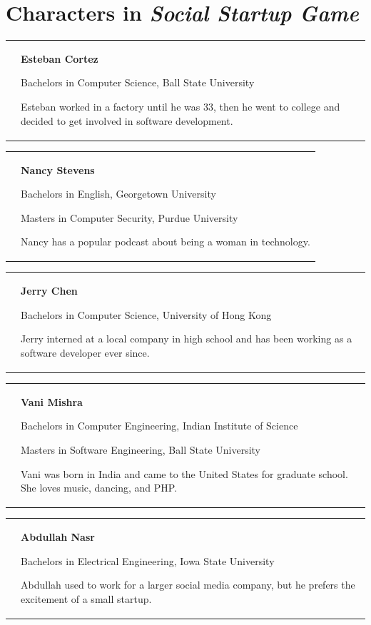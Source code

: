 \documentclass[letterpaper]{article}
\begin{document}
\clearpage
\section{Characters in \textit{Social Startup Game}}
\label{appendix:characters}

\newenvironment{character}[3]
{
\begin{tabular}{p{1.25in}p{4in}}
\raisebox{-0.5\height}{\texttt{[image: images/\#1.png]}} &
\textbf{#1 #2}
\begin{itemize*}
#3
\end{itemize*}
}
{
\end{tabular}
\bigskip
}

\begin{character}{Esteban}{Cortez}
{\item Bachelors in Computer Science, Ball State University}
Esteban worked in a factory until he was 33, then he went to college and decided to get involved in software development.
\end{character}

\begin{character}{Nancy}{Stevens}
{\item Bachelors in English, Georgetown University
 \item Masters in Computer Security, Purdue University}
Nancy has a popular podcast about being a woman in technology.
\end{character}

\begin{character}{Jerry}{Chen}
{\item Bachelors in Computer Science, University of Hong Kong}
Jerry interned at a local company in high school and has been working as a software developer ever since.
\end{character}

\begin{character}{Vani}{Mishra}
{\item Bachelors in Computer Engineering, Indian Institute of Science
 \item Masters in Software Engineering, Ball State University}
Vani was born in India and came to the United States for graduate school. She loves music, dancing, and PHP.
\end{character}

\begin{character}{Abdullah}{Nasr}
{\item Bachelors in Electrical Engineering, Iowa State University}
Abdullah used to work for a larger social media company, but he prefers the excitement of a small startup.
\end{character}
\end{document}
